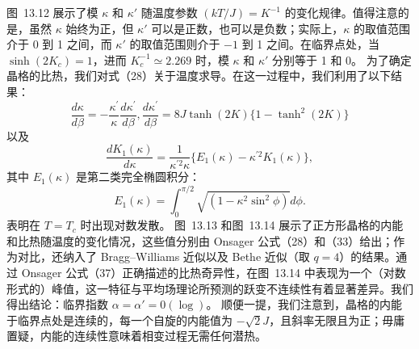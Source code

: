图~13.12 展示了模 \(\kappa\) 和 \(\kappa'\) 随温度参数 \((kT/J)=K^{-1}\) 的变化规律。值得注意的是，虽然 \(\kappa\) 始终为正，但 \(\kappa'\) 可以是正数，也可以是负数；实际上，\(\kappa\) 的取值范围介于 0 到 1 之间，而 \(\kappa'\) 的取值范围则介于 \(-1\) 到 1 之间。在临界点处，当 \(\sinh(2K_{c})=1\)，进而 \(K_{c}^{-1}\simeq2.269\) 时，模 \(\kappa\) 和 \(\kappa'\) 分别等于 1 和 0。
为了确定晶格的比热，我们对式（28）关于温度求导。在这一过程中，我们利用了以下结果：
\begin{equation}\tag{13.1.107}\label{eq:13.1.107}
\frac { d \kappa } { d \beta } = - \frac { \kappa ^{\prime} } { \kappa } \frac { d \kappa ^{\prime} } { d \beta } ,  \frac { d \kappa ^{\prime} } { d \beta } = 8 J \operatorname { t a n h } ( 2 K ) \{ 1 - \operatorname { t a n h } ^{2} ( 2 K ) \}
\end{equation}
以及
\begin{equation}\tag{13.1.108}\label{eq:13.1.108}
\frac { d K _ { 1 } ( \kappa ) } { d \kappa } = \frac { 1 } { \kappa ^{\prime 2} \kappa } \{ E _ { 1 } ( \kappa ) - \kappa ^{\prime 2} K _ { 1 } ( \kappa ) \} ,
\end{equation}
其中 \(E_{1}(\kappa)\) 是第二类完全椭圆积分：
\begin{equation}\tag{13.1.109}\label{eq:13.1.109}
E _ { 1 } ( \kappa ) = \int _ { 0 } ^{\pi / 2} \sqrt { ( 1 - \kappa ^{2} \sin ^{2} \phi ) } d \phi .
\end{equation}
表明在 \(T = T_c\) 时出现对数发散。
图~13.13 和图~13.14 展示了正方形晶格的内能和比热随温度的变化情况，这些值分别由 Onsager 公式（28）和（33）给出；作为对比，还纳入了 Bragg--Williams 近似以及 Bethe 近似（取 \(q=4\)）的结果。通过 Onsager 公式（37）正确描述的比热奇异性，在图~13.14 中表现为一个（对数形式的）峰值，这一特征与平均场理论所预测的跃变不连续性有着显著差异。我们得出结论：临界指数 \(\alpha=\alpha' = 0(\log)\)。
顺便一提，我们注意到，晶格的内能于临界点处是连续的，每一个自旋的内能值为 \(-\sqrt{2}J\)，且斜率无限且为正；毋庸置疑，内能的连续性意味着相变过程无需任何潜热。
